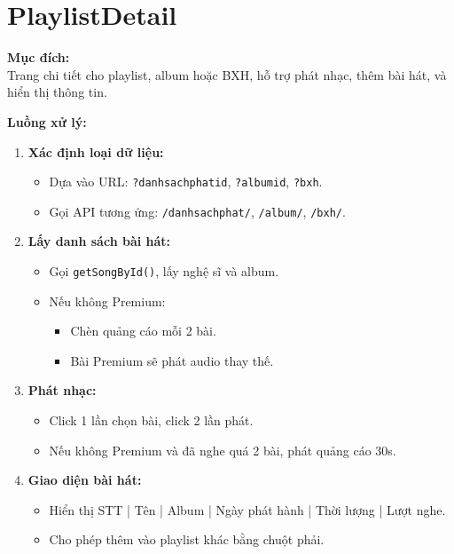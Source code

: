 \section{PlaylistDetail}

\textbf{Mục đích:} \\
Trang chi tiết cho playlist, album hoặc BXH, hỗ trợ phát nhạc, thêm bài hát, và hiển thị thông tin.

\textbf{Luồng xử lý:}
\begin{enumerate}
  \item \textbf{Xác định loại dữ liệu:}
  \begin{itemize}
    \item Dựa vào URL: \texttt{?danhsachphatid}, \texttt{?albumid}, \texttt{?bxh}.
    \item Gọi API tương ứng: \texttt{/danhsachphat/}, \texttt{/album/}, \texttt{/bxh/}.
  \end{itemize}

  \item \textbf{Lấy danh sách bài hát:}
  \begin{itemize}
    \item Gọi \texttt{getSongById()}, lấy nghệ sĩ và album.
    \item Nếu không Premium:
    \begin{itemize}
      \item Chèn quảng cáo mỗi 2 bài.
      \item Bài Premium sẽ phát audio thay thế.
    \end{itemize}
  \end{itemize}

  \item \textbf{Phát nhạc:}
  \begin{itemize}
    \item Click 1 lần chọn bài, click 2 lần phát.
    \item Nếu không Premium và đã nghe quá 2 bài, phát quảng cáo 30s.
  \end{itemize}

  \item \textbf{Giao diện bài hát:}
  \begin{itemize}
    \item Hiển thị STT | Tên | Album | Ngày phát hành | Thời lượng | Lượt nghe.
    \item Cho phép thêm vào playlist khác bằng chuột phải.
  \end{itemize}


\end{enumerate}
